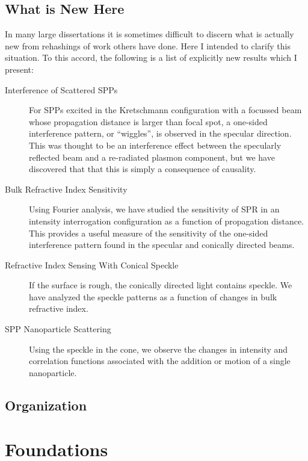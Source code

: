 \documentclass[a4paper,titlepage,onecolumn]{report}
\begin{document}
\section{What is New Here}
In many large dissertations it is sometimes difficult to discern what is
actually new from rehashings of work others have done.  Here I intended to
clarify this situation.  To this accord, the following is a list of
explicitly new results which I present:

\begin{description}
\item[{Interference of Scattered SPPs}]
For SPPs excited in the Kretschmann configuration with a focussed beam
whose propagation distance is larger than focal spot, a one-sided
interference pattern, or ``wiggles'', is observed in the specular direction.  This was
thought to be an interference effect between the specularly reflected beam
and a re-radiated plasmon component, but we have discovered that that this is
simply a consequence of causality.
\item[{Bulk Refractive Index Sensitivity}] 
Using Fourier analysis, we have studied the sensitivity of SPR in an intensity
interrogation configuration as a function of propagation distance.  This
provides a useful measure of the sensitivity of the one-sided interference
pattern found in the specular and conically directed beams.
\item[{Refractive Index Sensing With Conical Speckle}]
If the surface is rough, the conically directed light contains speckle.  We
have analyzed the speckle patterns as a function of changes in bulk
refractive index.
\item[{SPP Nanoparticle Scattering}]
Using the speckle in the cone, we observe the changes in intensity and
correlation functions associated with the addition or motion of a single
nanoparticle.
\end{description}

\section{Organization}

\chapter{Foundations}
\end{document}
